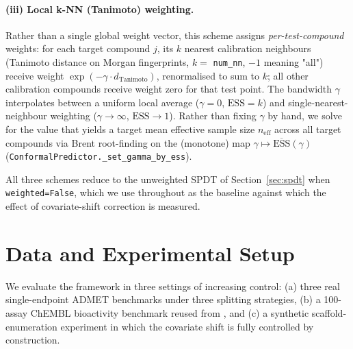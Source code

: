 \documentclass[11pt]{article}
\begin{document}
\paragraph{(iii) Local k-NN (Tanimoto) weighting.} Rather than a single global
weight vector, this scheme assigns \emph{per-test-compound} weights: for each
target compound $j$, its $k$ nearest calibration neighbours (Tanimoto
distance on Morgan fingerprints, $k = $ \texttt{num\_nn}, $-1$ meaning
"all") receive weight $\exp(-\gamma \cdot d_{\mathrm{Tanimoto}})$, renormalised
to sum to $k$; all other calibration compounds receive weight zero for that
test point. The bandwidth $\gamma$ interpolates between a uniform local
average ($\gamma=0$, $\mathrm{ESS}=k$) and single-nearest-neighbour weighting
($\gamma \to \infty$, $\mathrm{ESS}\to 1$). Rather than fixing $\gamma$ by
hand, we solve for the value that yields a target mean effective sample size
$n_{\mathrm{eff}}$ across all target compounds via Brent root-finding on the
(monotone) map $\gamma \mapsto \overline{\mathrm{ESS}}(\gamma)$
(\texttt{ConformalPredictor.\_set\_gamma\_by\_ess}).

All three schemes reduce to the unweighted SPDT of Section~\ref{sec:spdt}
when \texttt{weighted=False}, which we use throughout as the baseline against
which the effect of covariate-shift correction is measured.

\section{Data and Experimental Setup}
\label{sec:experiments}

We evaluate the framework in three settings of increasing control: (a) three
real single-endpoint ADMET benchmarks under three splitting strategies, (b) a
100-assay ChEMBL bioactivity benchmark reused from \citet{schiebroek2026}, and
(c) a synthetic scaffold-enumeration experiment in which the covariate shift
is fully controlled by construction.
\end{document}
